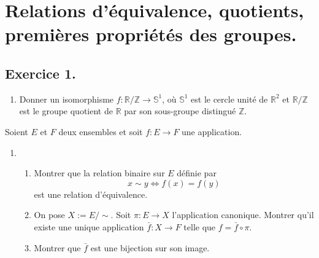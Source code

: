 \documentclass[./main]{subfiles}
\begin{document}
  \chapter{Relations d'équivalence, quotients, premières propriétés des groupes.}\label{td1}
  \minitoc

  \section{Exercice 1.}

  \begin{enonce}
    \begin{enumerate}
      \item Donner un isomorphisme $f : \mathds{R}/\mathds{Z} \to \mathds{S}^1$, où $\mathds{S}^1$ est le cercle unité de $\mathds{R}^2$ et $\mathds{R}/\mathds{Z}$ est le groupe quotient de $\mathds{R}$ par son sous-groupe distingué $\mathds{Z}$.
    \end{enumerate}

    Soient $E$ et $F$ deux ensembles et soit $f : E \to F$ une application.

    \begin{enumerate}[resume*]
      \item 
        \begin{enumerate}
          \item Montrer que la relation binaire sur $E$ définie par \[x \sim y \iff f(x) = f(y)\] est une relation d'équivalence.
          \item On pose $X := E/{\sim}$. Soit $\pi : E \to X$ l'application canonique. Montrer qu'il existe une unique application $\bar{f} : X \to F$ telle que $f = \bar{f} \circ \pi$.
          \item Montrer que $\bar{f}$ est une bijection sur son image.
        \end{enumerate}
    \end{enumerate}
  \end{enonce}
\end{document}

